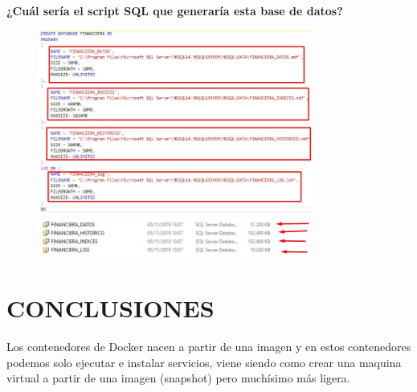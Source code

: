\documentclass[preprint,12pt]{elsarticle}
\begin{document}
\begin{enumerate}[a)]
\textbf{\\ ¿Cuál sería el script SQL que generaría esta base de datos?}
\begin{figure}[htb]
	\begin{center}
		\includegraphics[width=9cm]{./IMAGENES/Docker14}
		\includegraphics[width=9cm]{./IMAGENES/Docker15}
	\end{center}
\end{figure}
\end{enumerate}



\section{CONCLUSIONES}
Los contenedores de Docker nacen a partir de una imagen y en estos contenedores podemos solo ejecutar e instalar servicios, viene siendo como crear una maquina virtual a partir de una imagen (snapshot) pero muchísimo más ligera. 
\end{document}
